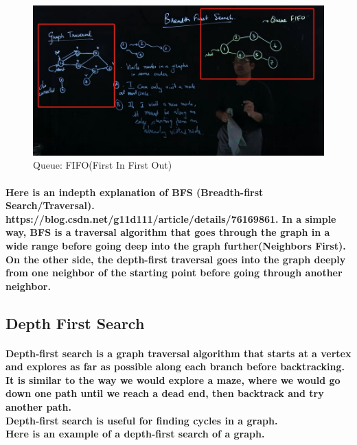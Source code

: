 \documentclass{article}
\begin{document}
\begin{figure}[H]
    \includegraphics[width=\textwidth]{breadthfirsttraversal.png}
    \caption{Queue: FIFO(First In First Out)}
\end{figure}

\paragraph{
    Here is an indepth explanation of BFS (Breadth-first Search/Traversal). 
    https://blog.csdn.net/g11d111/article/details/76169861.
    In a simple way, BFS is a traversal algorithm that goes through the graph in a wide range before going deep into the graph further(Neighbors First).\\
    On the other side, the depth-first traversal goes into the graph deeply from one neighbor of the starting point before going through 
    another neighbor.\\
}


\subsection{Depth First Search}

\paragraph{
    Depth-first search is a graph traversal algorithm that starts at a vertex and explores as far as possible along each branch before backtracking.\\
    It is similar to the way we would explore a maze, where we would go down one path until we reach a dead end, then backtrack and try another path.\\
    Depth-first search is useful for finding cycles in a graph.\\
    Here is an example of a depth-first search of a graph.\\
}
\end{document}
